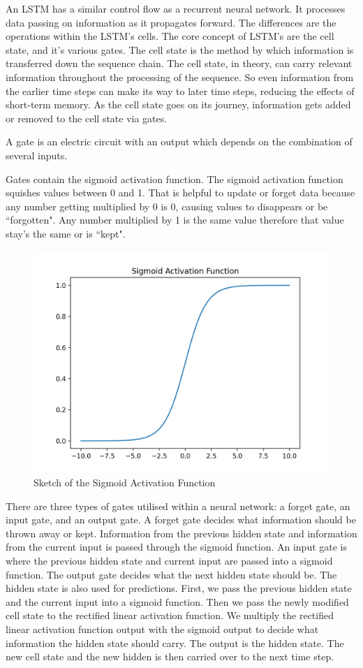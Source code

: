 An LSTM has a similar control flow as a recurrent neural network. It processes data passing on information as it propagates forward. The differences are the operations within the LSTM’s cells. The core concept of LSTM’s are the cell state, and it’s various gates. The cell state is the method by which information is transferred down the sequence chain. The cell state, in theory, can carry relevant information throughout the processing of the sequence. So even information from the earlier time steps can make its way to later time steps, reducing the effects of short-term memory. As the cell state goes on its journey, information gets added or removed to the cell state via gates\cite{lstm_rnn}.

\begin{definition}
A gate is an electric circuit with an output which depends on the combination of several inputs.
\end{definition}

Gates contain the sigmoid activation function. The sigmoid activation function squishes values between 0 and 1. That is helpful to update or forget data because any number getting multiplied by 0 is 0, causing values to disappears or be ``forgotten". Any number multiplied by 1 is the same value therefore that value stay’s the same or is ``kept".

\begin{figure}[H]
    \centering
    \includegraphics[width=.65\linewidth]{Images/sigmoid.png}
    \caption{Sketch of the Sigmoid Activation Function}
\end{figure}

There are three types of gates utilised within a neural network: a forget gate, an input gate, and an output gate. A forget gate decides what information should be thrown away or kept. Information from the previous hidden state and information from the current input is passed through the sigmoid function. An input gate is where the previous hidden state and current input are passed into a sigmoid function. The output gate decides what the next hidden state should be. The hidden state is also used for predictions. First, we pass the previous hidden state and the current input into a sigmoid function. Then we pass the newly modified cell state to the rectified linear activation function. We multiply the rectified linear activation function output with the sigmoid output to decide what information the hidden state should carry. The output is the hidden state. The new cell state and the new hidden is then carried over to the next time step\cite{lstm_rnn}.


